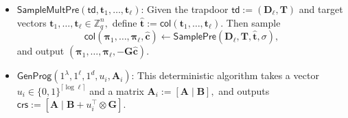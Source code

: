\begin{itemize}
\begin{itemize}
    \item Compute
    $
        \mathbf T'
        \leftarrow
        \mathsf{StructTrapGen}(\mathbf B,(u_i)_{i\in[\ell]})
        \in
        \mathbb Z_q^{(\ell \tilde{m}d+\tilde{m})\times \ell \tilde{m}},
    $
    where $\mathsf{StructTrapGen}$ is the algorithm from
    \cite[Lemma~4.1]{EC:WatWeeWu25}. It outputs a trapdoor $\mathbf T'$
    for the matrix
    \[
\left[
\begin{array}{cccc|c}
    \mathbf B - u_1^\top \otimes \mathbf G
        &        &        &        & \mathbf G \\
    & \mathbf B - u_2^\top \otimes \mathbf G
        &        &        & \mathbf G \\
    &        & \ddots &        & \vdots \\
    &        &        &
    \mathbf B - u_\ell^\top \otimes \mathbf G
        & \mathbf G
\end{array}
\right].
\]
    such that
    $
        \|\mathbf T'\|_\infty = 1.
    $

    \item Finally, the procedure defines
    $
        \mathbf T\in \mathbb Z_q^{(\ell t+\tilde{m})\times \ell \tilde{m}}
    $
    as
    \[
        \mathbf T
        :=
        \Pi^{-1}
        \begin{bmatrix}
            \mathbf 0_{\ell \tilde{m}\times \ell \tilde{m}}\\
            \mathbf T'
        \end{bmatrix}.
    \]
    The algorithm sets
    $
        \mathsf{td}:=(\mathbf D_\ell,\mathbf T)
    $
    and outputs
    $
        (\mathbf A_1,\ldots,\mathbf A_\ell,\mathsf{td}).
    $
\end{itemize}
    \item
    $\mathsf{SampleMultPre}(\mathsf{td},\mathbf t_1,\ldots,\mathbf t_\ell)$:
    Given the trapdoor
    $
        \mathsf{td}:=(\mathbf D_\ell,\mathbf T)
    $
    and target vectors
    $
        \mathbf t_1,\ldots,\mathbf t_\ell\in\mathbb Z_q^n,
    $
    define
    $
        \widehat{\mathbf t}
        :=
        \mathsf{col}(\mathbf t_1,\ldots,\mathbf t_\ell).
    $
    Then sample
    \[
        \mathsf{col}(\boldsymbol\pi_1,\ldots,\boldsymbol\pi_\ell,\widehat{\mathbf c})
        \leftarrow
        \mathsf{SamplePre}
        (\mathbf D_\ell,\mathbf T,\widehat{\mathbf t},\sigma),
    \]
    and output
    $
        (\boldsymbol\pi_1,\ldots,\boldsymbol\pi_\ell,-\mathbf G\widehat{\mathbf c}).
    $
    
    \item
    $\mathsf{GenProg}(1^\lambda,1^\ell,1^d,u_i,\mathbf A_i)$:
    This deterministic algorithm takes a vector
    $
        u_i\in\{0,1\}^{\lceil\log\ell\rceil}
    $
    and a matrix
    $
        \mathbf A_i:=[\mathbf A\mid \mathbf B],
    $
    and outputs
    $
        \mathsf{crs}:=
        [\mathbf A\mid \mathbf B+u_i^\top\otimes \mathbf G].
    $


\end{itemize}
